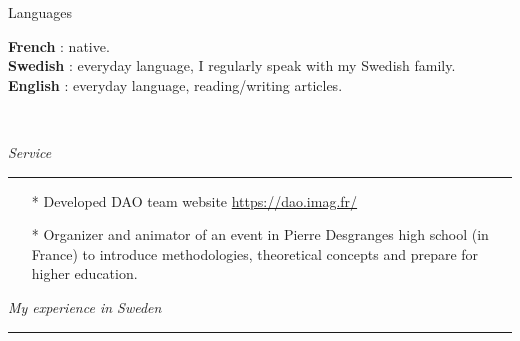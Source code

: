 \documentclass[a4paper,10pt]{article}
\begin{document}
	\noindent
	\begin{minipage}{0.20\textwidth}
		\color{MyGray} Languages
	\end{minipage}
	\hfill
	\begin{minipage}{0.70\textwidth}
		\textbf{French} : native.\\
		\textbf{Swedish} : everyday language, I regularly speak with my Swedish family.\\
		\textbf{English} : everyday language, reading/writing articles.\\
	\end{minipage}\\
	\vspace{2mm}
	
	\noindent
	\textit{\Large \color{MyGray} \hspace{5mm} Service}
	\vspace{2mm}
	{\color{DefaultGray}\hrule height .1pt}
	\vspace{5mm}
	
	\begin{itemize}
		\setlength\itemsep{3mm}
		\item[*] Developed DAO team website \url{https://dao.imag.fr/}
		\item[*] Organizer and animator of an event in Pierre Desgranges high school (in France) to introduce methodologies, theoretical concepts and prepare for higher education.
	\end{itemize}
	\vspace{5mm}
	
%	
	
	\noindent
	\textit{\Large \color{MyGray} \hspace{5mm} My experience in Sweden}
	\vspace{2mm}
	{\color{DefaultGray}\hrule height .1pt}
	\vspace{5mm}
	
\end{document}
